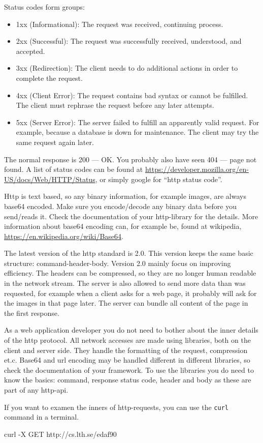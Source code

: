 Status codes form groups:
\begin{itemize}
\item1xx (Informational): The request was received, continuing process.
\item2xx (Successful): The request was successfully received, understood, and accepted.
\item3xx (Redirection): The client needs to do additional actions in order to complete the request.
\item4xx (Client Error): The request contains bad syntax or cannot be fulfilled. The client must rephrase the request before any later attempts.
\item5xx (Server Error): The server failed to fulfill an apparently valid request. For example, because a database is down for maintenance. The client may try the same request again later.
\end{itemize}
The normal response is 200 --- OK. You probably also have seen 404 --- page not found. A list of status codes can be found at \url{https://developer.mozilla.org/en-US/docs/Web/HTTP/Status}, or simply google for ``http status code''. 

Http is text based, so any binary information, for example images, are always base64 encoded. Make sure you encode/decode any binary data before you send/reads it. Check the documentation of your http-library for the details. More information about base64 encoding can, for example be, found at wikipedia, \url{https://en.wikipedia.org/wiki/Base64}.

The latest version of the http standard is 2.0. This version keeps the same basic structure: command-header-body. Version 2.0 mainly focus on improving efficiency. The headers can be compressed, so they are no longer human readable in the network stream. The server is also allowed to send more data than was requested, for example when a client asks for a web page, it probably will ask for the images in that page later. The server can bundle all content of the page in the first response.

As a web application developer you do not need to bother about the inner details of the http protocol. All network accesses are made using libraries, both on the client and server side. They handle the formatting of the request, compression et.c. Base64 and url encoding may be handled different in different libraries, so check the documentation of your framework. To use the libraries you do need to know the basics: command, response status code, header and body as these are part of any http-api.

If you want to examen the inners of http-requests, you can use the \texttt{curl} command in a terminal.
\begin{Code}
curl -X GET http://cs.lth.se/edaf90
\end{Code}
